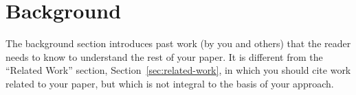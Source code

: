 \section{Background}
\label{sec:background}

The background section introduces past work (by you
and others) that the reader needs to know to understand
the rest of your paper.
%
It is different from the ``Related Work'' section,
Section~\ref{sec:related-work},
in which you should cite work related to your paper,
but which is not integral to the basis of your approach.




